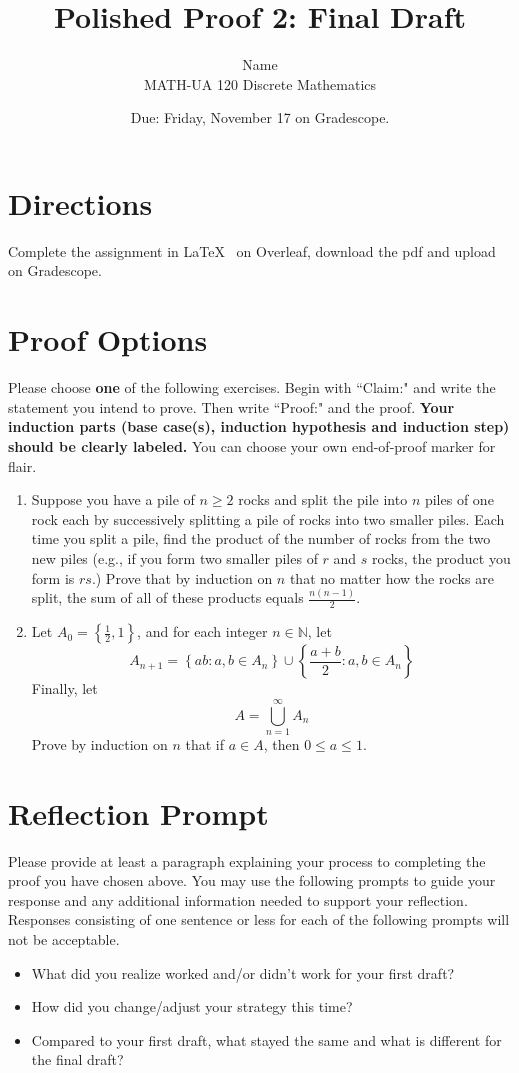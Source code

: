 \documentclass{article}
\title{Polished Proof 2: Final Draft}
\author{%
	Name
	\\
	MATH-UA 120 Discrete Mathematics
}
\date{Due: Friday, November 17 on Gradescope.}
\theoremstyle{definition}
\begin{document}
	\maketitle
	
	\section*{Directions}

Complete the assignment in \LaTeX~  on Overleaf, download the pdf and upload on Gradescope.


\section*{Proof Options}

Please choose \textbf{one} of the following exercises. Begin with ``Claim:" and write the statement you intend to prove. Then write ``Proof:" and the proof. \textbf{Your induction parts (base case(s), induction hypothesis and induction step) should be clearly labeled.} You can choose your own end-of-proof marker for flair.

\begin{enumerate}
	\item 
    Suppose you have a pile of $n\geq 2$ rocks and split the pile into $n$ piles of one rock each by successively splitting a pile of rocks into two smaller piles. Each time you split a pile, find the product of the number of rocks from the two new piles (e.g., if you form two smaller piles of $r$ and $s$ rocks, the product you form is $rs$.) Prove that by induction on $n$ that no matter how the rocks are split, the sum of all of these products equals $\frac{n(n-1)}{2}$.
	\item
    Let $A_0 = \left\{\frac{1}{2},1\right\}$, and for each integer $n \in \mathbb{N}$, let 
    \[
        A_{n+1} = \left\{ab : a,b \in A_n\right\}
                    \cup \left\{\frac{a+b}{2} : a,b\in A_n \right\}
    \]
    Finally, let 
    \[
        A = \bigcup_{n=1}^\infty A_n
    \]
    Prove by induction on $n$ that if $a\in A$, then $0\leq a\leq 1$.

\end{enumerate}


\section*{Reflection Prompt}
    Please provide at least a paragraph explaining your process to completing the proof you have chosen above. You may use the following prompts to guide your response and any additional information needed to support your reflection. Responses consisting of one sentence or less for each of the following prompts will not be acceptable.
    \begin{itemize}
        \item What did you realize worked and/or didn't work for your first draft?
        \item How did you change/adjust your strategy this time?
        \item Compared to your first draft, what stayed the same and what is different for the final draft?
    \end{itemize}
\end{document}
